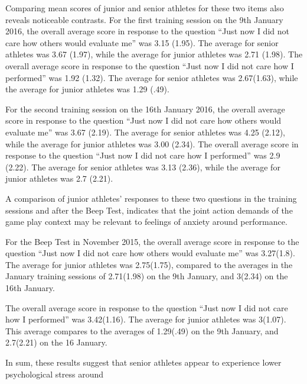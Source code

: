 \begin{CJK}{UTF8}{gbsn}
Comparing mean scores of junior and senior athletes for these two items also reveals noticeable contrasts.  For the first training session on the 9th January 2016, the overall average score in response to the question ``Just now I did not care how others would evaluate me'' was 3.15 (1.95).  The average for senior athletes was 3.67   (1.97), while the average for junior athletes was 2.71 (1.98).
The overall average score in response to the question ``Just now I did not care how I performed'' was 1.92 (1.32).  The average for senior athletes was 2.67(1.63), while the average for junior athletes was 1.29 (.49).

For the second training session on the 16th January 2016, the overall average score in response to the question ``Just now I did not care how others would evaluate me'' was 3.67 (2.19).  The average for senior athletes was 4.25 (2.12), while the average for junior athletes was 3.00 (2.34).
The overall average score in response to the question ``Just now I did not care how I performed'' was 2.9 (2.22).  The average for senior athletes was 3.13 (2.36), while the average for junior athletes was 2.7 (2.21).


A comparison of junior athletes' responses to these two questions in the training sessions and after the Beep Test, indicates that the joint action demands of the game play context may be relevant to feelings of anxiety around performance.

For the Beep Test in November 2015, the overall average score in response to the question ``Just now I did not care how others would evaluate me'' was 3.27(1.8).  The average for junior athletes was 2.75(1.75), compared to the averages in the January training sessions of 2.71(1.98) on the 9th January, and 3(2.34) on the 16th January.

The overall average score in response to the question ``Just now I did not care how I performed'' was 3.42(1.16).  The average for junior athletes was 3(1.07).  This average compares to the averages of 1.29(.49) on the 9th January, and 2.7(2.21) on the 16 January.


In sum, these results suggest that senior athletes appear to experience lower psychological stress around 





\end{CJK}

